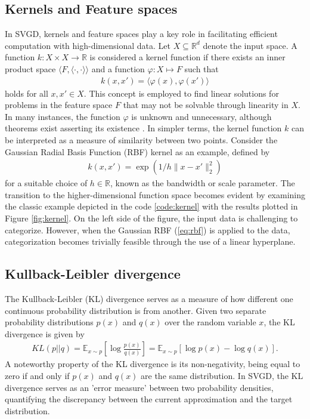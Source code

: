 \documentclass[11pt]{isr} %
\begin{document}
\subsection*{Kernels and Feature spaces} 
In SVGD, kernels and feature spaces play a key role in facilitating efficient computation with high-dimensional data.
Let $X \subseteq \mathbb{R}^d$ denote the input space.
A function $k: X \times X \rightarrow \mathbb{R}$ is considered a kernel function if there exists an inner product space $\langle F, \langle\cdot,\cdot\rangle \rangle$ and a function $\varphi: X \mapsto F$ such that
\begin{align*}
k(x, x') = \langle \varphi(x), \varphi(x') \rangle
\end{align*}
holds for all $x, x' \in X$.
This concept is employed to find linear solutions for problems in the feature space $F$ that may not be solvable through linearity in $X$.
In many instances, the function $\varphi$ is unknown and unnecessary, although theorems exist asserting its existence \cite{berlinet2011reproducing, kreyszig1991introductory}. 
In simpler terms, the kernel function $k$ can be interpreted as a measure of similarity between two points.
Consider the Gaussian Radial Basis Function (RBF) kernel as an example, defined by
\begin{align}
k(x, x') = \exp\left( 1/h \lVert x - x' \rVert_{2}^{2} \right)
\label{eq:rbf}
\end{align}
for a suitable choice of $h \in \mathbb{R}$, known as the bandwidth or scale parameter.
The transition to the higher-dimensional function space becomes evident by examining the classic example depicted in the code \ref{code:kernel} with the results plotted in Figure \ref{fig:kernel}. On the left side of the figure, the input data is challenging to categorize.
However, when the Gaussian RBF (\ref{eq:rbf}) is applied to the data, categorization becomes trivially feasible through the use of a linear hyperplane.

\subsection*{Kullback-Leibler divergence}
The Kullback-Leibler (KL) divergence serves as a measure of how different one continuous probability distribution is from another.
Given two separate probability distributions $p(x)$ and $q(x)$ over the random variable $x$, the KL divergence \cite{goodfellow2016deep} is given by
\begin{align*}
  KL \left( p || q \right) = \mathbb{E}_{x \sim p} \left[ \log \frac{p(x)}{q(x)} \right] = \mathbb{E}_{x \sim p} \left[ \log{p(x)} - \log{q(x)} \right].
  \label{eq:kl}
\end{align*}
A noteworthy property of the KL divergence is its non-negativity, being equal to zero if and only if $p(x)$ and $q(x)$ are the same distribution.
In SVGD, the KL divergence serves as an 'error measure' between two probability densities, quantifying the discrepancy between the current approximation and the target distribution.
\end{document}
